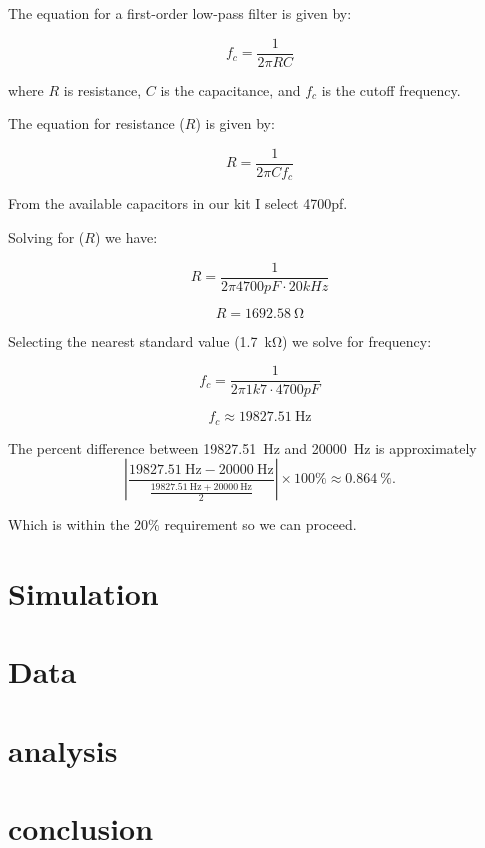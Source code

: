 \documentclass[conference]{IEEEtran}
\begin{document}
	The equation for a first-order low-pass filter is given by:
	
	\[
	f_c = \frac{1}{2\pi RC} \tag{LPF Cutoff Frequency}
	\]
	
	where \(R\) is resistance, \(C\) is the capacitance, and \(f_c\) is the cutoff frequency.
		
	The equation for resistance (\(R\)) is given by:
	
	\[
	R = \frac{1}{2\pi Cf_c} \tag{LPF Resistance}
	\]
	
	
	
	From the available capacitors in our kit I select 4700pf.
	
	Solving for (\(R\)) we have:
	
	\[
	R = \frac{1}{2\pi 4700pF \cdot 20kHz}
	\]
	
	\[
	R = \SI{1692.58}{\ohm}
	\]
	
	Selecting the nearest standard value (\SI{1.7}{\kohm}) we solve for frequency:
	
	\[
	f_c = \frac{1}{2\pi 1k7 \cdot 4700pF}
	\]
	
	\[
	f_c \approx \SI{19827.51}{\hertz}
	\]
	
	
	The percent difference between \SI{19827.51}{\hertz} and \SI{20000}{\hertz} is approximately
	\[
	\left| \frac{\SI{19827.51}{\hertz} - \SI{20000}{\hertz}}{\frac{\SI{19827.51}{\hertz} + \SI{20000}{\hertz}}{2}} \right| \times 100\% \approx \SI{0.864}{\percent}.
	\]
	
	Which is within the 20\% requirement so we can proceed.
	
	\section{Simulation}
	
	
	
	\section{Data}
	
	\section{analysis}
	
	\section{conclusion}
	
	
\end{document}
